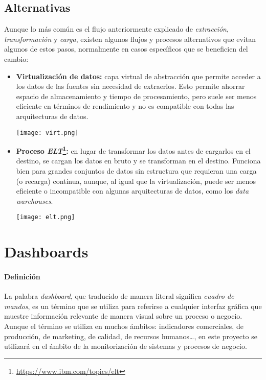 \newpage{}
\subsection{Alternativas}
Aunque lo más común es el flujo anteriormente explicado de \textit{extracción}, \textit{transformación} y
\textit{carga}, existen algunos flujos y procesos alternativos que evitan algunos de estos pasos, normalmente
en casos específicos que se beneficien del cambio:

\begin{itemize}
	\item \textbf{Virtualización de datos:} capa virtual de abstracción que permite acceder a los datos de las
		fuentes sin necesidad de extraerlos. Esto permite ahorrar espacio de almacenamiento y tiempo de procesamiento,
		pero suele ser menos eficiente en términos de rendimiento y no es compatible con todas las arquitecturas de
		datos.

		\begin{minipage}{\linewidth}
			\centering
			\texttt{[image: virt.png]}
		\end{minipage}
	\item \textbf{Proceso \textit{ELT}\footnote{\url{https://www.ibm.com/topics/elt}}:} en lugar de transformar
		los datos antes de cargarlos en el destino, se cargan los datos en bruto y se transforman en el destino.
		Funciona bien para grandes conjuntos de datos sin estructura que requieran una carga (o recarga) contínua,
		aunque, al igual que la virtualización, puede ser menos eficiente o incompatible con algunas arquitecturas
		de datos, como los \textit{data warehouses}.

		\begin{minipage}{\linewidth}
			\centering
			\texttt{[image: elt.png]}
		\end{minipage}
\end{itemize}


\newpage{}
\section{Dashboards}\label{sec:dashboards}
\paragraph{Definición}
La palabra \textit{dashboard}, que traducido de manera literal significa \textit{cuadro de mandos},
es un término que se utiliza para referirse a cualquier interfaz gráfica que muestre información
relevante de manera visual sobre un proceso o negocio. Aunque el término se utiliza en
muchos ámbitos: indicadores comerciales, de producción, de marketing, de calidad, de recursos
humanos\ldots, en este proyecto se utilizará en el ámbito de la monitorización de sistemas y
procesos de negocio.

